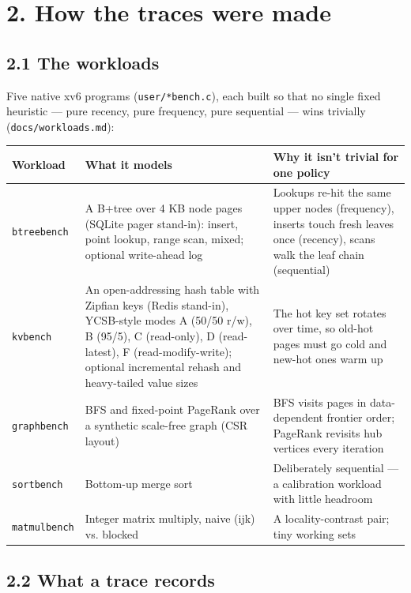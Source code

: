 \documentclass[10pt,a4paper]{article}
\newcommand{\code}[1]{\texttt{#1}}
\begin{document}
\section*{2. How the traces were made}

\subsection*{2.1 The workloads}

Five native xv6 programs (\code{user/\allowbreak{}*bench.\allowbreak{}c}), each built so that no single fixed heuristic — pure recency, pure frequency, pure sequential — wins trivially (\code{docs/\allowbreak{}workloads.\allowbreak{}md}):

\begin{center}\footnotesize
\begin{tabularx}{\linewidth}{lXX}
\toprule
\textbf{Workload} & \textbf{What it models} & \textbf{Why it isn't trivial for one policy} \\ \midrule
\code{btreebench} & A B+tree over 4 KB node pages (SQLite pager stand-in): insert, point lookup, range scan, mixed; optional write-ahead log & Lookups re-hit the same upper nodes (frequency), inserts touch fresh leaves once (recency), scans walk the leaf chain (sequential) \\
\code{kvbench} & An open-addressing hash table with Zipfian keys (Redis stand-in), YCSB-style modes A (50/50 r/w), B (95/5), C (read-only), D (read-latest), F (read-modify-write); optional incremental rehash and heavy-tailed value sizes & The hot key set rotates over time, so old-hot pages must go cold and new-hot ones warm up \\
\code{graphbench} & BFS and fixed-point PageRank over a synthetic scale-free graph (CSR layout) & BFS visits pages in data-dependent frontier order; PageRank revisits hub vertices every iteration \\
\code{sortbench} & Bottom-up merge sort & Deliberately sequential — a calibration workload with little headroom \\
\code{matmulbench} & Integer matrix multiply, naive (ijk) vs. blocked & A locality-contrast pair; tiny working sets \\
\bottomrule
\end{tabularx}
\end{center}

\subsection*{2.2 What a trace records}
\end{document}
